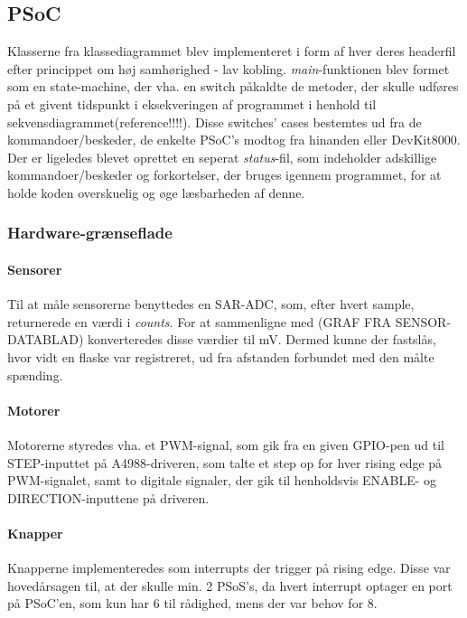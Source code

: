 \subsection{PSoC}
Klasserne fra klassediagrammet blev implementeret i form af hver deres headerfil efter princippet om høj samhørighed - lav kobling. \textit{main}-funktionen blev formet som en state-machine, der vha. en switch påkaldte de metoder, der skulle udføres på et givent tidspunkt i eksekveringen af programmet i henhold til sekvensdiagrammet(reference!!!!). Disse switches' cases bestemtes ud fra de kommandoer/beskeder, de enkelte PSoC's modtog fra hinanden eller DevKit8000. Der er ligeledes blevet oprettet en seperat \textit{status}-fil, som indeholder adskillige kommandoer/beskeder og forkortelser, der bruges igennem programmet, for at holde koden overskuelig og øge læsbarheden af denne.

\subsubsection{Hardware-grænseflade}
\paragraph{Sensorer}
Til at måle sensorerne benyttedes en SAR-ADC, som, efter hvert sample, returnerede en værdi i \textit{counts}. For at sammenligne med (GRAF FRA SENSOR-DATABLAD) konverteredes disse værdier til mV. Dermed kunne der fastslås, hvor vidt en flaske var registreret, ud fra afstanden forbundet med den målte spænding.

\paragraph{Motorer}
Motorerne styredes vha. et PWM-signal, som gik fra en given GPIO-pen ud til STEP-inputtet på A4988-driveren, som talte et step op for hver rising edge på PWM-signalet, samt to digitale signaler, der gik til henholdsvis ENABLE- og DIRECTION-inputtene på driveren.

\paragraph{Knapper}
Knapperne implementeredes som interrupts der trigger på rising edge. Disse var hovedårsagen til, at der skulle min. 2 PSoS's, da hvert interrupt optager en port på PSoC'en, som kun har 6 til rådighed, mens der var behov for 8.